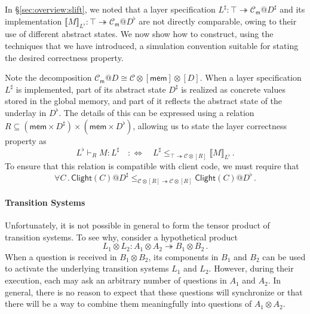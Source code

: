 \documentclass[acmsmall,screen,review,anonymous]{acmart}
\newcommand{\kw}[1]{\ensuremath{ \mathsf{#1} }}
\begin{document}
\begin{example}
In \S\ref{sec:overview:slift},
we noted that a layer specification
$L^\sharp : \top \twoheadrightarrow \mathcal{C}_\kw{m}@D^\sharp$
and its implementation
$\llbracket M \rrbracket_{L^\flat} :
 \top \twoheadrightarrow \mathcal{C}_\kw{m}@D^\flat$
are not directly comparable, owing to their
use of different abstract states.
We now show how to construct,
using the techniques that we have introduced,
a simulation convention suitable for
stating the desired correctness property.

Note the decomposition
$\mathcal{C}_\kw{m}@D \cong \mathcal{C} \otimes [\kw{mem}] \otimes [D]$.
When a layer specification $L^\sharp$ is implemented,
part of its abstract state $D^\sharp$ is realized as concrete values
stored in the global memory,
and part of it reflects the abstract state of the underlay in $D^\flat$.
The details of this can be expressed using a relation
$R \subseteq (\kw{mem} \times D^\sharp) \times (\kw{mem} \times D^\flat)$,
allowing us to state the layer correctness property as
\[
  L^\flat \vdash_R M : L^\sharp \quad :\Leftrightarrow \quad
    L^\sharp \le_{\top \twoheadrightarrow \mathcal{C} \otimes [R]}
    \llbracket M \rrbracket_{L^\flat}
  \,.
\]
To ensure that this relation is compatible with client code,
we must require that
\[
  \forall C \mathbin.
    \kw{Clight}(C)@D^\sharp
    \le_{\mathcal{C} \otimes [R] \twoheadrightarrow \mathcal{C} \otimes [R]}
    \kw{Clight}(C)@D^\flat
  \,.
\]
\end{example}


\paragraph{Transition Systems}

Unfortunately,
it is not possible in general
to form the tensor product of transition systems.
To see why, consider a hypothetical product
\[
  L_1 \otimes L_2 : A_1 \otimes A_2 \twoheadrightarrow B_1 \otimes B_2
  \,.
\]
When a question is received in $B_1 \otimes B_2$,
its components in $B_1$ and $B_2$ can be used to activate
the underlying transition systems $L_1$ and $L_2$.
However, during their execution,
each may ask
an arbitrary number of questions in $A_1$ and $A_2$.
In general,
there is no reason to expect that these questions
will synchronize or
that there will be a way to
combine them meaningfully
into questions of $A_1 \otimes A_2$.
\end{document}
